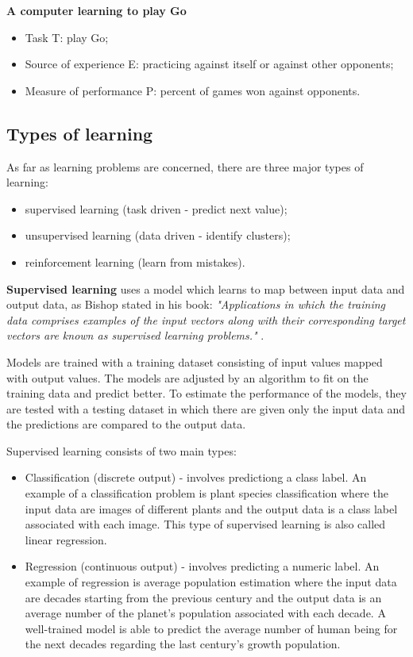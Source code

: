 \documentclass[runningheads,a4paper,12pt]{report}
\begin{document}
\textbf{A computer learning to play Go}
\begin{itemize}
\item Task T: play Go;
\item Source of experience E: practicing against itself or against other opponents;
\item Measure of performance P: percent of games won against opponents. 
\end{itemize}

\subsection{Types of learning}
\label{section:types}
As far as learning problems are concerned, there are three major types of learning: 
\begin{itemize}
\item supervised learning (task driven - predict next value);
\item unsupervised learning (data driven - identify clusters);
\item reinforcement learning (learn from mistakes).
\end{itemize}

\bigskip
\bigskip

\textbf{Supervised learning} uses a model which learns to map between input data and output data, as Bishop stated in his book: 
\emph{"Applications in which the training data comprises examples of the input vectors along with their corresponding target vectors are known as supervised learning problems."} \cite{bishop}. 

Models are trained with a training dataset consisting of input values mapped with output values. The models are adjusted by an algorithm to fit on the training data and predict better. To estimate the performance of the models, they are tested with a testing dataset in which there are given only the input data and the predictions are compared to the output data. 

Supervised learning consists of two main types: 
\begin{itemize}
\item Classification (discrete output) - involves predictiong a class label. An example of a classification problem is plant species classification where the input data are images of different plants and the output data is a class label associated with each image. This type of supervised learning is also called linear regression.
\item Regression (continuous output) - involves predicting a numeric label. An example of regression is average population estimation where the input data are decades starting from the previous century and the output data is an average number of the planet's population associated with each decade. A well-trained model is able to predict the average number of human being for the next decades regarding the last century's growth population. 
\end{itemize}
\end{document}
